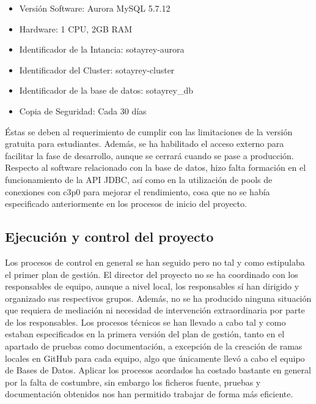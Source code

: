 \begin{itemize}
	\item Versión Software: Aurora MySQL 5.7.12
	\item Hardware: 1 CPU, 2GB RAM
	\item Identificador de la Intancia: sotayrey-aurora
	\item Identificador del Cluster: sotayrey-cluster
	\item Identificador de la base de datos: sotayrey\_db
	\item Copia de Seguridad: Cada 30 días
\end{itemize}

Éstas se deben al requerimiento de cumplir con las limitaciones de la versión gratuita para estudiantes. Además, se ha habilitado el acceso externo para facilitar la fase de desarrollo, aunque se cerrará cuando se pase a producción. Respecto al software relacionado con la base de datos, hizo falta formación en el funcionamiento de la API JDBC, así como en la utilización de pools de conexiones con c3p0 para mejorar el rendimiento, cosa que no se había especificado anteriormente en los procesos de inicio del proyecto.

\subsection{Ejecución y control del proyecto}
\label{ejecucion}
Los procesos de control en general se han seguido pero no tal y como estipulaba el primer plan de gestión. El director del proyecto no se ha coordinado con los responsables de equipo, aunque a nivel local, los responsables sí han dirigido y organizado sus respectivos grupos. Además, no se ha producido ninguna situación que requiera de mediación ni necesidad de intervención extraordinaria por parte de los responsables. 
Los procesos técnicos se han llevado a cabo tal y como estaban especificados en la primera versión del plan de gestión, tanto en el apartado de pruebas como documentación, a excepción de la creación de ramas locales en GitHub para cada equipo, algo que únicamente llevó a cabo el equipo de Bases de Datos. Aplicar los procesos acordados ha costado bastante en general por la falta de costumbre, sin embargo los ficheros fuente, pruebas y documentación obtenidos nos han permitido trabajar de forma más eficiente.

